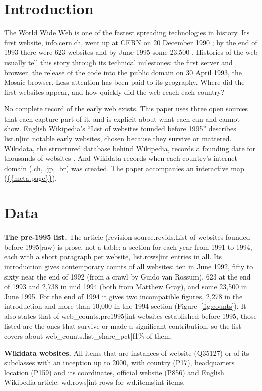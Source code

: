 \documentclass[11pt,a4paper]{article}
\begin{document}
\section{Introduction}
The World Wide Web is one of the fastest spreading technologies in history. Its first website, info.cern.ch, went up at CERN on 20 December 1990 \citep{wikihist}; by the end of 1993 there were 623 websites and by June 1995 some 23,500 \citep{wikilist}. Histories of the web usually tell this story through its technical milestones: the first server and browser, the release of the code into the public domain on 30 April 1993, the Mosaic browser. Less attention has been paid to its geography. Where did the first websites appear, and how quickly did the web reach each country?

No complete record of the early web exists. This paper uses three open sources that each capture part of it, and is explicit about what each can and cannot show. English Wikipedia's ``List of websites founded before 1995'' \citep{wikilist} describes {{list.n|int}} notable early websites, chosen because they survive or mattered. Wikidata, the structured database behind Wikipedia, records a founding date for thousands of websites \citep{wikidata}. And Wikidata records when each country's internet domain (.ch, .jp, .br) was created. The paper accompanies an interactive map (\url{{{meta.page}}}).

\section{Data}
\textbf{The pre-1995 list.} The article (revision {{source.revids.List of websites founded before 1995|raw}}) is prose, not a table: a section for each year from 1991 to 1994, each with a short paragraph per website, {{list.rows|int}} entries in all. Its introduction gives contemporary counts of all websites: ten in June 1992, fifty to sixty near the end of 1992 (from a crawl by Guido van Rossum), 623 at the end of 1993 and 2,738 in mid 1994 (both from Matthew Gray), and some 23,500 in June 1995. For the end of 1994 it gives two incompatible figures, 2,278 in the introduction and more than 10,000 in the 1994 section (Figure~\ref{fig:counts}). It also states that of {{web_counts.pre1995|int}} websites established before 1995, those listed are the ones that survive or made a significant contribution, so the list covers about {{web_counts.list_share_pct|f1}}\% of them.

\textbf{Wikidata websites.} All items that are instances of website (Q35127) or of its subclasses with an inception up to 2000, with country (P17), headquarters location (P159) and its coordinates, official website (P856) and English Wikipedia article: {{wd.rows|int}} rows for {{wd.items|int}} items.
\end{document}
